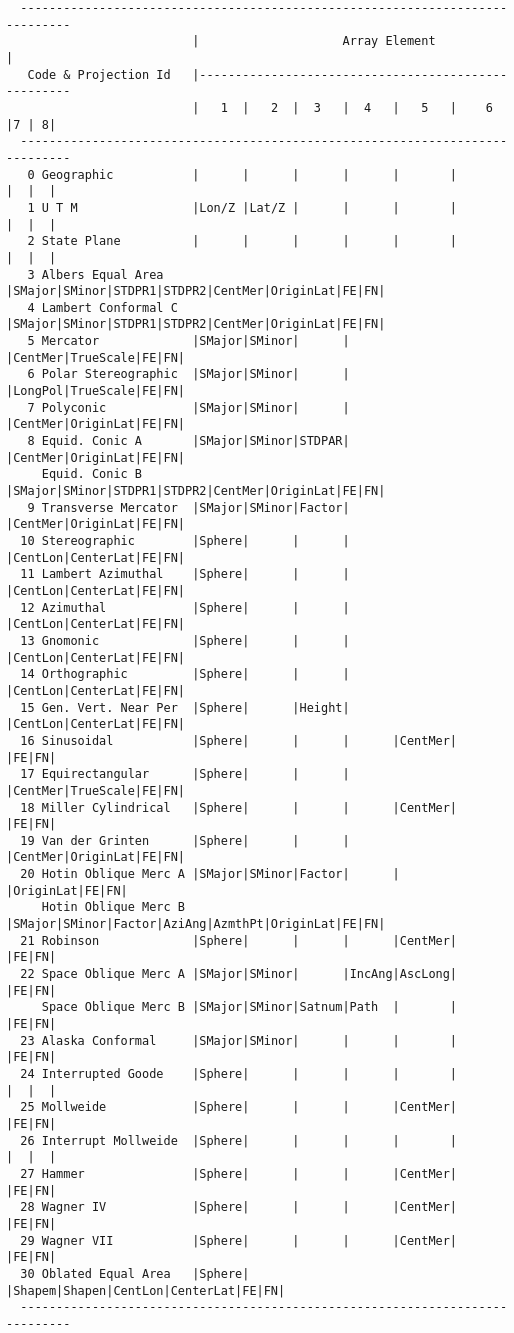 \begin{verbatim}
  -----------------------------------------------------------------------------
                          |                    Array Element                  |
   Code & Projection Id   |----------------------------------------------------
                          |   1  |   2  |  3   |  4   |   5   |    6    |7 | 8|
  -----------------------------------------------------------------------------
   0 Geographic           |      |      |      |      |       |         |  |  |
   1 U T M                |Lon/Z |Lat/Z |      |      |       |         |  |  |
   2 State Plane          |      |      |      |      |       |         |  |  |
   3 Albers Equal Area    |SMajor|SMinor|STDPR1|STDPR2|CentMer|OriginLat|FE|FN|
   4 Lambert Conformal C  |SMajor|SMinor|STDPR1|STDPR2|CentMer|OriginLat|FE|FN|
   5 Mercator             |SMajor|SMinor|      |      |CentMer|TrueScale|FE|FN|
   6 Polar Stereographic  |SMajor|SMinor|      |      |LongPol|TrueScale|FE|FN|
   7 Polyconic            |SMajor|SMinor|      |      |CentMer|OriginLat|FE|FN|
   8 Equid. Conic A       |SMajor|SMinor|STDPAR|      |CentMer|OriginLat|FE|FN|
     Equid. Conic B       |SMajor|SMinor|STDPR1|STDPR2|CentMer|OriginLat|FE|FN|
   9 Transverse Mercator  |SMajor|SMinor|Factor|      |CentMer|OriginLat|FE|FN|
  10 Stereographic        |Sphere|      |      |      |CentLon|CenterLat|FE|FN|
  11 Lambert Azimuthal    |Sphere|      |      |      |CentLon|CenterLat|FE|FN|
  12 Azimuthal            |Sphere|      |      |      |CentLon|CenterLat|FE|FN|
  13 Gnomonic             |Sphere|      |      |      |CentLon|CenterLat|FE|FN|
  14 Orthographic         |Sphere|      |      |      |CentLon|CenterLat|FE|FN|
  15 Gen. Vert. Near Per  |Sphere|      |Height|      |CentLon|CenterLat|FE|FN|
  16 Sinusoidal           |Sphere|      |      |      |CentMer|         |FE|FN|
  17 Equirectangular      |Sphere|      |      |      |CentMer|TrueScale|FE|FN|
  18 Miller Cylindrical   |Sphere|      |      |      |CentMer|         |FE|FN|
  19 Van der Grinten      |Sphere|      |      |      |CentMer|OriginLat|FE|FN|
  20 Hotin Oblique Merc A |SMajor|SMinor|Factor|      |       |OriginLat|FE|FN|
     Hotin Oblique Merc B |SMajor|SMinor|Factor|AziAng|AzmthPt|OriginLat|FE|FN|
  21 Robinson             |Sphere|      |      |      |CentMer|         |FE|FN|
  22 Space Oblique Merc A |SMajor|SMinor|      |IncAng|AscLong|         |FE|FN|
     Space Oblique Merc B |SMajor|SMinor|Satnum|Path  |       |         |FE|FN|
  23 Alaska Conformal     |SMajor|SMinor|      |      |       |         |FE|FN|
  24 Interrupted Goode    |Sphere|      |      |      |       |         |  |  |
  25 Mollweide            |Sphere|      |      |      |CentMer|         |FE|FN|
  26 Interrupt Mollweide  |Sphere|      |      |      |       |         |  |  |
  27 Hammer               |Sphere|      |      |      |CentMer|         |FE|FN|
  28 Wagner IV            |Sphere|      |      |      |CentMer|         |FE|FN|
  29 Wagner VII           |Sphere|      |      |      |CentMer|         |FE|FN|
  30 Oblated Equal Area   |Sphere|      |Shapem|Shapen|CentLon|CenterLat|FE|FN|
  -----------------------------------------------------------------------------
  

\end{verbatim}
